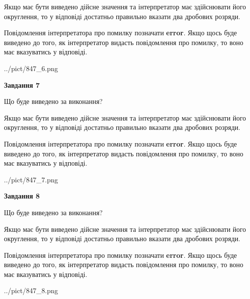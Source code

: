 \documentclass[12pt, ukrainian]{article}
\begin{document}
{\begin {Large}
Якщо має бути виведено дійсне значення та інтерпретатор має здійснювати його округлення, 
то у відповіді достатньо правильно вказати два дробових розряди.

Повідомлення інтерпретатора про помилку позначати \textbf{error}.
Якщо щось буде виведено до того, як інтерпретатор видасть повідомлення про помилку, 
то воно має вказуватись у відповіді. \par

\begin{center}
	{../pict/847_6.png}
\end{center}
\newpage

{\begin {center}\textbf{Завдання 7}\end {center}}\par
Що буде виведено за виконання? \par

Якщо має бути виведено дійсне значення та інтерпретатор має здійснювати його округлення, 
то у відповіді достатньо правильно вказати два дробових розряди.

Повідомлення інтерпретатора про помилку позначати \textbf{error}.
Якщо щось буде виведено до того, як інтерпретатор видасть повідомлення про помилку, 
то воно має вказуватись у відповіді. \par

\begin{center}
	{../pict/847_7.png}
\end{center}
\newpage

{\begin {center}\textbf{Завдання 8}\end {center}}\par
Що буде виведено за виконання? \par

Якщо має бути виведено дійсне значення та інтерпретатор має здійснювати його округлення, 
то у відповіді достатньо правильно вказати два дробових розряди.

Повідомлення інтерпретатора про помилку позначати \textbf{error}.
Якщо щось буде виведено до того, як інтерпретатор видасть повідомлення про помилку, 
то воно має вказуватись у відповіді. \par

\begin{center}
	{../pict/847_8.png}
\end{center}
\newpage


\end{Large}}
\end{document}
